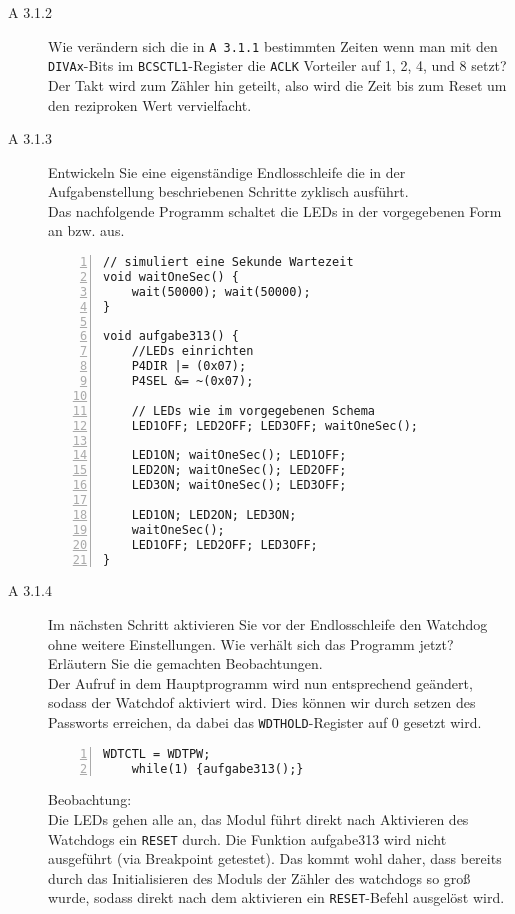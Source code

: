\documentclass[11pt,a4paper,ngerman]{article}
\begin{document}
\begin{description}
	\item[A 3.1.2] Wie verändern sich die in \texttt{A 3.1.1} bestimmten Zeiten wenn man mit den \texttt{DIVAx}-Bits im \texttt{BCSCTL1}-Register die \texttt{ACLK} Vorteiler auf 1, 2, 4, und 8 setzt?  \\
	
	Der Takt wird zum Zähler hin geteilt, also wird die Zeit bis zum Reset um den reziproken Wert vervielfacht. 	
	
	\item[A 3.1.3] Entwickeln Sie eine eigenständige Endlosschleife die in der Aufgabenstellung beschriebenen Schritte zyklisch ausführt.  \\
	
	Das nachfolgende Programm schaltet die LEDs in der vorgegebenen Form an bzw. aus.
\begin{lstlisting}[numbers=left]
// simuliert eine Sekunde Wartezeit
void waitOneSec() {
	wait(50000); wait(50000);
}

void aufgabe313() {
	//LEDs einrichten
	P4DIR |= (0x07);
	P4SEL &= ~(0x07);
	
	// LEDs wie im vorgegebenen Schema
	LED1OFF; LED2OFF; LED3OFF; waitOneSec();
	
	LED1ON; waitOneSec(); LED1OFF;
	LED2ON; waitOneSec(); LED2OFF;
	LED3ON; waitOneSec(); LED3OFF;

	LED1ON; LED2ON; LED3ON;
	waitOneSec();
	LED1OFF; LED2OFF; LED3OFF;
}
\end{lstlisting}
	
		 
	\item[A 3.1.4]  Im nächsten Schritt aktivieren Sie vor der Endlosschleife den Watchdog ohne weitere Einstellungen. Wie verhält sich das Programm jetzt? Erläutern Sie die gemachten Beobachtungen.   \\
	
	Der Aufruf in dem Hauptprogramm wird nun entsprechend geändert, sodass der Watchdof aktiviert wird. Dies können wir durch setzen des Passworts erreichen, da dabei das \texttt{WDTHOLD}-Register auf 0 gesetzt wird.
	
	\begin{lstlisting}[numbers=left]
	WDTCTL = WDTPW;
	while(1) {aufgabe313();}
	\end{lstlisting}
	
	Beobachtung: \\
Die LEDs gehen alle an, das Modul führt direkt nach Aktivieren des Watchdogs ein \texttt{RESET} durch. Die Funktion aufgabe313 wird nicht ausgeführt (via Breakpoint getestet). Das kommt wohl daher, dass bereits durch das Initialisieren des Moduls der Zähler des watchdogs so groß wurde, sodass direkt nach dem aktivieren ein \texttt{RESET}-Befehl ausgelöst wird.
	

\end{description}
\end{document}
